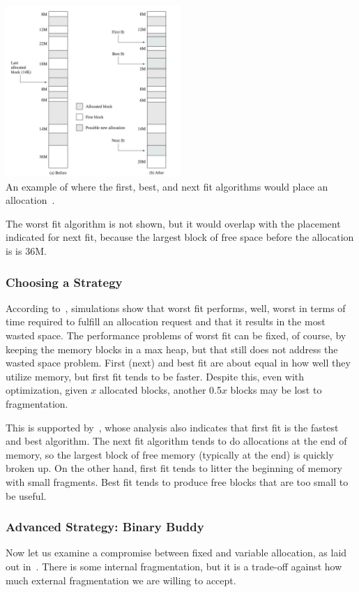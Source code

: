 \begin{center}
\includegraphics[width=0.50\textwidth]{images/first-best-next.png}\\
An example of where the first, best, and next fit algorithms would place an allocation~\cite{osi}.
\end{center}

The worst fit algorithm is not shown, but it would overlap with the placement indicated for next fit, because the largest block of free space before the allocation is is 36M.

\subsubsection*{Choosing a Strategy}

According to~\cite{osc}, simulations show that worst fit performs, well, worst in terms of time required to fulfill an allocation request and that it results in the most wasted space. The performance problems of worst fit can be fixed, of course, by keeping the memory blocks in a max heap, but that still does not address the wasted space problem. First (next) and best fit are about equal in how well they utilize memory, but first fit tends to be faster. Despite this, even with optimization, given $x$ allocated blocks, another 0.5$x$ blocks may be lost to fragmentation.

This is supported by~\cite{osi}, whose analysis also indicates that first fit is the fastest and best algorithm. The next fit algorithm tends to do allocations at the end of memory, so the largest block of free memory (typically at the end) is quickly broken up. On the other hand, first fit tends to litter the beginning of memory with small fragments. Best fit tends to produce free blocks that are too small to be useful. 

\subsubsection*{Advanced Strategy: Binary Buddy}
Now let us examine a compromise between fixed and variable allocation, as laid out in~\cite{osi}. There is some internal fragmentation, but it is a trade-off against how much external fragmentation we are willing to accept.

